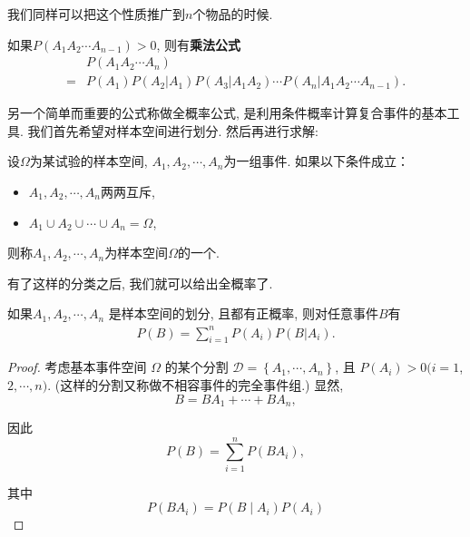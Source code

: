 我们同样可以把这个性质推广到$n$个物品的时候.

\begin{corollary}
    如果$P(A_1 A_2\cdots A_{n-1})>0$, 则有\textbf{乘法公式}
    \begin{align*}
          & P(A_1A_2\cdots A_n)                                                \\
        = & P(A_1)P(A_2|A_1)P(A_3|A_1 A_2)\cdots P(A_n|A_1 A_2\cdots A_{n-1}).
    \end{align*}
\end{corollary}



另一个简单而重要的公式称做全概率公式, 是利用条件概率计算复合事件的基本工具. 我们首先希望对样本空间进行划分. 然后再进行求解:

\begin{definition}
    设$\Omega$为某试验的样本空间, $A_1, A_2, \cdots, A_n$为一组事件. 如果以下条件成立：
    \begin{itemize}
        \item $A_1, A_2, \cdots, A_n$两两互斥, 
        \item $A_1 \cup A_2 \cup \cdots \cup A_n=\Omega$, 
    \end{itemize}
    则称$A_1, A_2, \cdots , A_n$为样本空间$\Omega$的一个. 
\end{definition}


有了这样的分类之后, 我们就可以给出全概率了.

\begin{theorem}
    如果$A_1, A_2, \cdots, A_n$ 是样本空间的划分, 且都有正概率, 则对任意事件$B$有
    \begin{align*}
        P(B)=\sum_{i=1}^n P(A_i) P(B|A_i).
    \end{align*}
\end{theorem}

\begin{proof}
    考虑基本事件空间 $\Omega$ 的某个分割 $\mathscr{D}=\left\{A_1, \cdots, A_n\right\}$, 且 $P\left(A_i\right)>0(i=1$, $2, \cdots, n)$. (这样的分割又称做不相容事件的完全事件组.) 显然,
$$
B=B A_1+\cdots+B A_n,
$$

因此
$$
P(B)=\sum_{i=1}^n P\left(B A_i\right),
$$

其中
$$
P\left(B A_i\right)=P\left(B \mid A_i\right) P\left(A_i\right)
$$
\end{proof}


